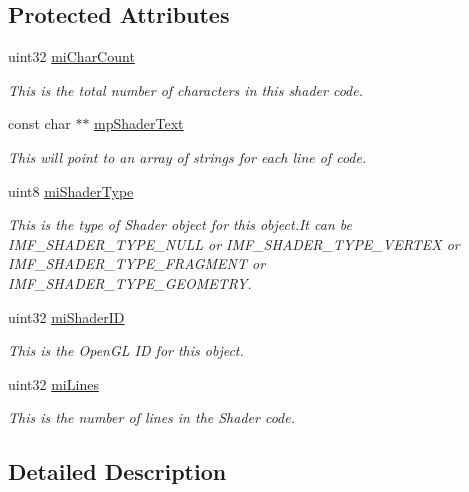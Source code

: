 \subsection*{Protected Attributes}
\begin{DoxyCompactItemize}
\item 
uint32 \hyperlink{classc_shader_a5d7be0d9322637d16534445ad619cd1c}{miCharCount}
\begin{DoxyCompactList}\small\item\em This is the total number of characters in this shader code. \item\end{DoxyCompactList}\item 
const char $\ast$$\ast$ \hyperlink{classc_shader_a181f19f059df6cb1054babb884587fa1}{mpShaderText}
\begin{DoxyCompactList}\small\item\em This will point to an array of strings for each line of code. \item\end{DoxyCompactList}\item 
uint8 \hyperlink{classc_shader_aee3159aac2c9f2eb140a11b8c72fd521}{miShaderType}
\begin{DoxyCompactList}\small\item\em This is the type of Shader object for this object.It can be IMF\_\-SHADER\_\-TYPE\_\-NULL or IMF\_\-SHADER\_\-TYPE\_\-VERTEX or IMF\_\-SHADER\_\-TYPE\_\-FRAGMENT or IMF\_\-SHADER\_\-TYPE\_\-GEOMETRY. \item\end{DoxyCompactList}\item 
uint32 \hyperlink{classc_shader_a52b252fefd228939fbed7d342a3b2054}{miShaderID}
\begin{DoxyCompactList}\small\item\em This is the OpenGL ID for this object. \item\end{DoxyCompactList}\item 
uint32 \hyperlink{classc_shader_ab3f9fef98b65463f22225dc44a22824f}{miLines}
\begin{DoxyCompactList}\small\item\em This is the number of lines in the Shader code. \item\end{DoxyCompactList}\end{DoxyCompactItemize}


\subsection{Detailed Description}


